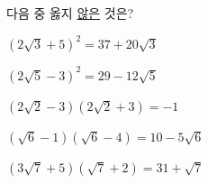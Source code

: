 다음 중 옳지 \underline{않은} 것은?
\begin{choicesv}{\rule[-3ex]{0pt}{8ex}$(2\sqrt{3}+5)^2=37+20\sqrt{3}$}{\rule[-3ex]{0pt}{8ex}$(2\sqrt{5}-3)^2=29-12\sqrt{5}$}{\rule[-3ex]{0pt}{8ex}$(2\sqrt{2}-3)(2\sqrt{2}+3)=-1$}{\rule[-3ex]{0pt}{8ex}$(\sqrt{6}-1)(\sqrt{6}-4)=10-5\sqrt{6}$}{\rule[-3ex]{0pt}{8ex}$(3\sqrt{7}+5)(\sqrt{7}+2)=31+\sqrt{7}$}\end{choicesv}
